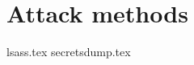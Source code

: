 \documentclass{article}
\begin{document}
\section{Attack methods}

{lsass.tex}
{secretsdump.tex}
\end{document}
